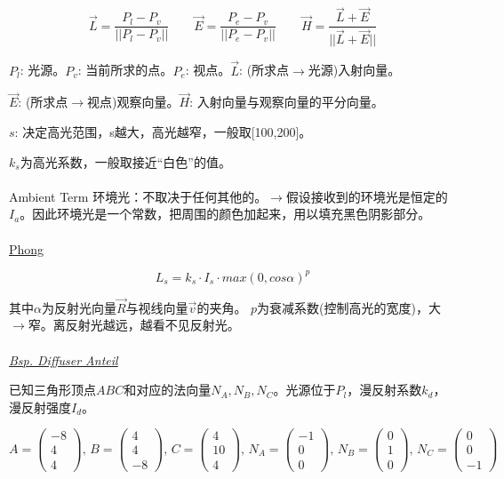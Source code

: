 \documentclass[fleqn]{article}
\begin{document}
$$\overrightarrow{L}=\frac{P_l-P_v}{||P_l-P_v||}\qquad \overrightarrow{E}=\frac{P_e-P_v}{||P_e-P_v||}\qquad \overrightarrow{H}=\frac{\overrightarrow{L}+\overrightarrow{E}}{||\overrightarrow{L}+\overrightarrow{E}||}$$

$P_l$: 光源。$P_v$: 当前所求的点。$P_e$: 视点。$\overrightarrow{L}$: (所求点$\rightarrow$光源)入射向量。

$\overrightarrow{E}$: (所求点$\rightarrow$视点)观察向量。$\overrightarrow{H}$: 入射向量与观察向量的平分向量。

$s$: 决定高光范围，s越大，高光越窄，一般取[100,200]。

$k_s$为高光系数，一般取接近“白色”的值。
\\
\\
\noindent Ambient Term 环境光：不取决于任何其他的。$\rightarrow$假设接收到的环境光是恒定的$I_a$。因此环境光是一个常数，把周围的颜色加起来，用以填充黑色阴影部分。
\\
\\
\underline{Phong}

$$L_s=k_s\cdot I_s\cdot max(0,cos\alpha)^p$$

其中$\alpha$为反射光向量$\overrightarrow{R}$与视线向量$\overrightarrow{v}$的夹角。
$p$为衰减系数(控制高光的宽度)，大$\rightarrow$窄。离反射光越远，越看不见反射光。
\\
\\
\underline{\textit{Bsp. Diffuser Anteil}}

已知三角形顶点$ABC$和对应的法向量$N_A,N_B,N_C$。光源位于$P_l$，漫反射系数$k_d$，漫反射强度$I_d$。

$$A=\begin{pmatrix}
    -8\\4\\4
\end{pmatrix},\,B=\begin{pmatrix}
    4\\4\\-8
\end{pmatrix},\,C=\begin{pmatrix}
    4\\10\\4
\end{pmatrix},\,N_A=\begin{pmatrix}
    -1\\0\\0
\end{pmatrix},\,N_B=\begin{pmatrix}
    0\\1\\0
\end{pmatrix},\,N_C=\begin{pmatrix}
    0\\0\\-1
\end{pmatrix}$$
\end{document}
